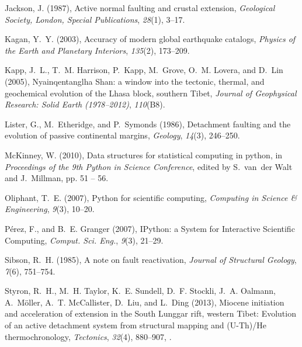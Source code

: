 \documentclass[draft,grl]{AGUTeX}
\begin{document}
\begin{article}
\begin{thebibliography}{32}
Jackson, J. (1987), Active normal faulting and crustal extension,
  \textit{Geological Society, London, Special Publications}, \textit{28}(1),
  3--17.

Kagan, Y.~Y. (2003), Accuracy of modern global earthquake catalogs,
  \textit{Physics of the Earth and Planetary Interiors}, \textit{135}(2),
  173--209.

Kapp, J.~L., T.~M. Harrison, P.~Kapp, M.~Grove, O.~M. Lovera, and D.~Lin
  (2005), Nyainqentanglha {S}han: a window into the tectonic, thermal, and
  geochemical evolution of the {L}hasa block, southern {T}ibet, \textit{Journal
  of Geophysical Research: Solid Earth (1978--2012)}, \textit{110}(B8).

Lister, G., M.~Etheridge, and P.~Symonds (1986), Detachment faulting and the
  evolution of passive continental margins, \textit{Geology}, \textit{14}(3),
  246--250.

McKinney, W. (2010), Data structures for statistical computing in python, in
  \textit{Proceedings of the 9th Python in Science Conference}, edited by
  S.~van~der Walt and J.~Millman, pp. 51 -- 56.

Oliphant, T.~E. (2007), Python for scientific computing, \textit{Computing in
  Science \& Engineering}, \textit{9}(3), 10--20.

P\'erez, F., and B.~E. Granger (2007), {IP}ython: a {S}ystem for {I}nteractive
  {S}cientific {C}omputing, \textit{{C}omput. {S}ci. {E}ng.}, \textit{9}(3),
  21--29.

Sibson, R.~H. (1985), A note on fault reactivation, \textit{Journal of
  Structural Geology}, \textit{7}(6), 751--754.

Styron, R.~H., M.~H. Taylor, K.~E. Sundell, D.~F. Stockli, J.~A. Oalmann,
  A.~M{\"o}ller, A.~T. McCallister, D.~Liu, and L.~Ding (2013), Miocene
  initiation and acceleration of extension in the {S}outh {L}unggar rift,
  western {T}ibet: Evolution of an active detachment system from structural
  mapping and ({U}-{T}h)/{H}e thermochronology, \textit{Tectonics},
  \textit{32}(4), 880--907, .


\end{thebibliography}
\end{article}
\end{document}
